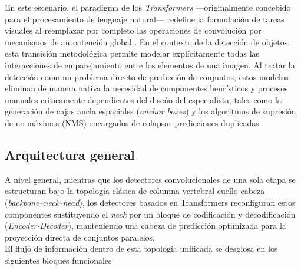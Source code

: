 En este escenario, el paradigma de los \textit{Transformers} ---originalmente concebido para el procesamiento de lenguaje natural--- redefine la formulación de tareas visuales al reemplazar por completo las operaciones de convolución por mecanismos de autoatención global \cite{vaswani2017attention}. En el contexto de la detección de objetos, esta transición metodológica permite modelar explícitamente todas las interacciones de emparejamiento entre los elementos de una imagen. Al tratar la detección como un problema directo de predicción de conjuntos, estos modelos eliminan de manera nativa la necesidad de componentes heurísticos y procesos manuales críticamente dependientes del diseño del especialista, tales como la generación de cajas ancla espaciales (\textit{anchor boxes}) y los algoritmos de supresión de no máximos (NMS) encargados de colapsar predicciones duplicadas \cite{carion2020end}.\\

\subsection{Arquitectura general}

A nivel general, mientras que los detectores convolucionales de una sola etapa se estructuran bajo la topología clásica de columna vertebral-cuello-cabeza (\textit{backbone--neck--head}), los detectores basados en Transformers reconfiguran estos componentes sustituyendo el \textit{neck} por un bloque de codificación y decodificación (\textit{Encoder-Decoder}), manteniendo una cabeza de predicción optimizada para la proyección directa de conjuntos paralelos.\\

El flujo de información dentro de esta topología unificada se desglosa en los siguientes bloques funcionales:

